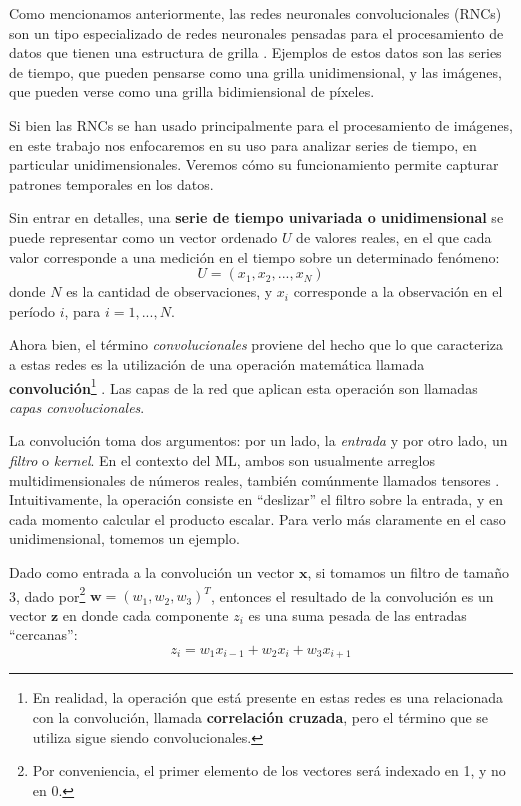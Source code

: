 \documentclass[../../main.tex]{subfiles}
\begin{document}
Como mencionamos anteriormente, las redes neuronales convolucionales (RNCs) son un tipo
especializado de redes neuronales pensadas para el procesamiento de datos que tienen una
estructura de grilla \cite{deep-learning}. Ejemplos de estos datos son las series de
tiempo, que pueden pensarse como una grilla unidimensional, y las imágenes, que pueden
verse como una grilla bidimiensional de píxeles.

Si bien las RNCs se han usado principalmente para el procesamiento de imágenes, en este
trabajo nos enfocaremos en su uso para analizar series de tiempo, en particular
unidimensionales. Veremos cómo su funcionamiento permite capturar patrones temporales en
los datos.

Sin entrar en detalles, una \textbf{serie de tiempo univariada o
unidimensional} se puede representar como un vector ordenado \(U\) de valores reales, en
el que cada valor corresponde a una medición en el tiempo sobre un determinado fenómeno:
\[
    U = (x_1, x_2, ..., x_N)
\]
donde \(N\) es la cantidad de observaciones, y \(x_i\) corresponde a la observación
en el período \(i\), para \(i = 1,...,N\).

Ahora bien, el término \textit{convolucionales} proviene del hecho que lo que caracteriza
a estas redes es la utilización de una operación matemática llamada
\textbf{convolución}\footnote{En realidad, la operación que está presente en estas redes
es una relacionada con la convolución, llamada \textbf{correlación cruzada}, pero el
término que se utiliza sigue siendo convolucionales.} \cite{deep-learning}. Las capas de
la red que aplican esta operación son llamadas \textit{capas convolucionales}.

La convolución toma dos argumentos: por un lado, la \textit{entrada} y por otro lado, un
\textit{filtro} o \textit{kernel}. En el contexto del ML, ambos son usualmente arreglos
multidimensionales de números reales, también comúnmente llamados tensores
\cite{deep-learning}. Intuitivamente, la operación consiste en ``deslizar'' el filtro
sobre la entrada, y en cada momento calcular el producto escalar. Para verlo más
claramente en el caso unidimensional, tomemos un ejemplo.

Dado como entrada a la convolución un vector \(\bm{x}\), si tomamos un filtro de tamaño 3,
dado por\footnote{Por conveniencia, el primer elemento de los vectores será indexado en 1,
y no en 0.} \(\bm{w}=(w_1, w_2, w_3)^T\), entonces el resultado de la convolución es un
vector \(\bm{z}\) en donde cada componente \(z_i\) es una suma pesada de las entradas
``cercanas'':
\[z_i = w_1 x_{i-1} + w_2 x_{i} + w_3 x_{i+1}\]
\end{document}
